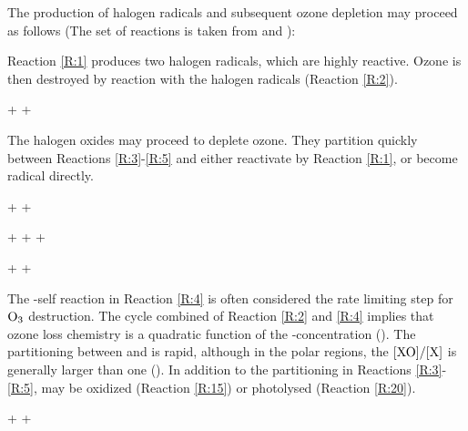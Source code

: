 \medskip



The production of halogen radicals and subsequent ozone depletion may proceed as follows (The set of reactions is taken from \cite{CAO} and \cite{Simpson2015}): 

\medskip

Reaction \ref{R:1} produces two halogen radicals, which are highly reactive. Ozone is then destroyed by reaction with the halogen radicals (Reaction \ref{R:2}).

\begin{reaction}
     +  \rightarrow {} + 
    \label{R:2}
\end{reaction}

The halogen oxides may proceed to deplete ozone. They partition quickly between Reactions \ref{R:3}-\ref{R:5} and either reactivate by Reaction \ref{R:1}, or become radical directly.


\begin{reaction}
     +  \rightarrow {} +  \label{R:3} 
\end{reaction}


\begin{reaction}
     +  \rightarrow {} +  +  \label{R:4} 
\end{reaction}


\begin{reaction}
     +  \rightarrow {} +  \label{R:5} 
\end{reaction}

The -self reaction in Reaction \ref{R:4} is often considered the rate limiting step for $\mathrm{O_3}$ destruction. The cycle combined of Reaction \ref{R:2} and \ref{R:4} implies that ozone loss chemistry is a quadratic function of the -concentration (\cite{Hausmann1994}). The partitioning between  and  is rapid, although in the polar regions, the $[\mathrm{XO}]/[\mathrm{X}]$ is generally larger than one (\cite{Schmidt}). In addition to the partitioning in Reactions \ref{R:3}-\ref{R:5},  may be oxidized (Reaction \ref{R:15}) or photolysed (Reaction \ref{R:20}).

\begin{reaction}
     +  \rightarrow {} + 
    \label{R:15}
\end{reaction}

